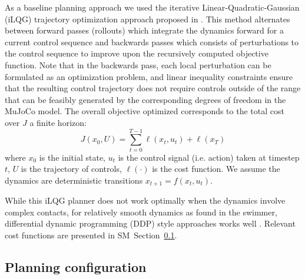 As a baseline planning approach we used the iterative Linear-Quadratic-Gaussian (iLQG) trajectory optimization approach proposed in \cite{tassa2014control}.  This method alternates between forward passes (rollouts) which integrate the dynamics forward for a current control sequence and backwards passes which consists of perturbations to the control sequence to improve upon the recursively computed objective function.  
Note that in the backwards pass, each local perturbation can be formulated as an optimization problem, and linear inequality constraints ensure that the resulting control trajectory does not require controls outside of the range that can be feasibly generated by the corresponding degrees of freedom in the MuJoCo model.
The overall objective optimized corresponds to the total cost over $J$ a finite horizon:
\begin{equation}
    J(x_0, U) = \sum_{t=0}^{T-1} \ell (x_t, u_t) + \ell (x_T)
\end{equation}
where $x_0$ is the initial state, $u_t$ is the control signal (i.e. action) taken at timestep $t$, $U$ is the trajectory of controls, $\ell(\cdot)$ is the cost function.  We assume the dynamics are deterministic transitions $x_{t+1} = f(x_t, u_t)$. 

While this iLQG planner does not work optimally when the dynamics involve complex contacts, for relatively smooth dynamics as found in the swimmer, differential dynamic programming (DDP) style approaches works well \cite{tassa2008receding}.  Relevant cost functions are presented in SM~Section~\ref{sm:sec:planning_configuration}. 

\subsection{Planning configuration}
\label{sm:sec:planning_configuration}

